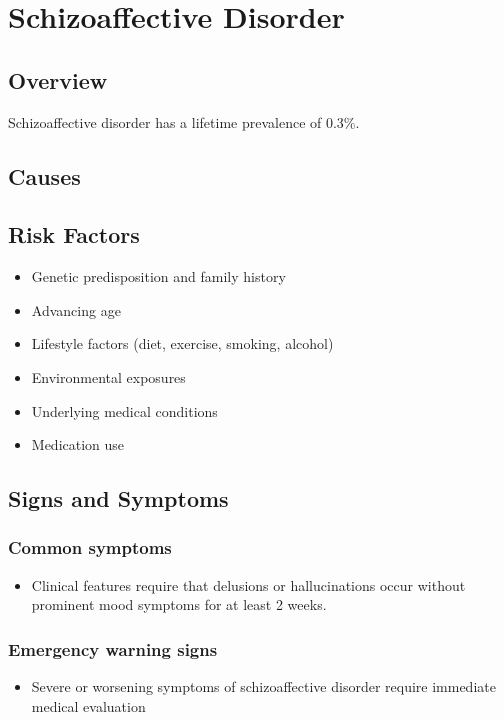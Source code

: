 \chapter{Schizoaffective Disorder}
\label{sec:Schizoaffective Disorder}

\section{Overview}
Schizoaffective disorder has a lifetime prevalence of 0.3\%.
\section{Causes}
\section{Risk Factors}

\begin{itemize}[noitemsep]
  \item Genetic predisposition and family history
  \item Advancing age
  \item Lifestyle factors (diet, exercise, smoking, alcohol)
  \item Environmental exposures
  \item Underlying medical conditions
  \item Medication use
\end{itemize}
\section{Signs and Symptoms}

\subsection{Common symptoms}
\begin{itemize}[noitemsep]
  \item Clinical features require that delusions or hallucinations occur without prominent mood symptoms for at least 2 weeks. 
  \end{itemize}

\subsection{Emergency warning signs}
\begin{itemize}[noitemsep]
  \item Severe or worsening symptoms of schizoaffective disorder require immediate medical evaluation
\end{itemize}
